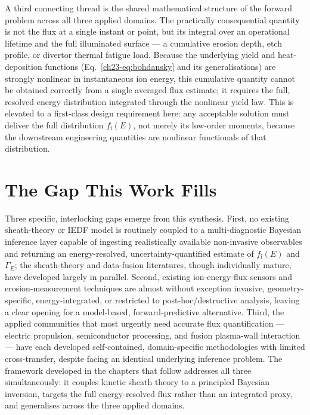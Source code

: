 A third connecting thread is the shared mathematical structure of the forward problem across all three applied domains. The practically consequential quantity is not the flux at a single instant or point, but its integral over an operational lifetime and the full illuminated surface — a cumulative erosion depth, etch profile, or divertor thermal fatigue load. Because the underlying yield and heat-deposition functions (Eq.~\eqref{ch23-eq:bohdansky} and its generalisations) are strongly nonlinear in instantaneous ion energy, this cumulative quantity cannot be obtained correctly from a single averaged flux estimate; it requires the full, resolved energy distribution integrated through the nonlinear yield law. This is elevated to a first-class design requirement here: any acceptable solution must deliver the full distribution $f_{\mathrm{i}}(E)$, not merely its low-order moments, because the downstream engineering quantities are nonlinear functionals of that distribution.

\section{The Gap This Work Fills}

Three specific, interlocking gaps emerge from this synthesis. First, no existing sheath-theory or IEDF model is routinely coupled to a multi-diagnostic Bayesian inference layer capable of ingesting realistically available non-invasive observables and returning an energy-resolved, uncertainty-quantified estimate of $f_{\mathrm{i}}(E)$ and $\Gamma_{E}$; the sheath-theory and data-fusion literatures, though individually mature, have developed largely in parallel. Second, existing ion-energy-flux sensors and erosion-measurement techniques are almost without exception invasive, geometry-specific, energy-integrated, or restricted to post-hoc/destructive analysis, leaving a clear opening for a model-based, forward-predictive alternative. Third, the applied communities that most urgently need accurate flux quantification — electric propulsion, semiconductor processing, and fusion plasma-wall interaction — have each developed self-contained, domain-specific methodologies with limited cross-transfer, despite facing an identical underlying inference problem. The framework developed in the chapters that follow addresses all three simultaneously: it couples kinetic sheath theory to a principled Bayesian inversion, targets the full energy-resolved flux rather than an integrated proxy, and generalises across the three applied domains.

